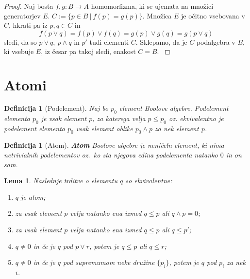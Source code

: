 \documentclass{amsart}
\newtheorem{lema}[izrek]{Lema}
\newtheorem{definicija}[izrek]{Definicija}
\begin{document}
\begin{proof}
    Naj bosta \(f,g : B \to A\) homomorfizma, ki se ujemata na množici generatorjev $E$.
    \(C := \{p \in B~|~ f(p) = g (p)\}\). Množica $E$ je očitno vsebovana v
    $C$, hkrati pa iz \(p,q \in C\) in 
    \[f(p \vee q) = f(p) \vee f(q) = g(p) \vee g(q) = g(p\vee q)\]
    sledi, da so \(p \vee q,~ p \wedge q\) in \(p'\) tudi elementi $C$.
    Sklepamo, da je $C$ podalgebra v $B$, ki vsebuje $E$, iz česar pa takoj sledi, 
    enakost \(C = B\).
    \label{enolicno}
\end{proof}

\section{Atomi}

\begin{definicija}[Podelement]
    Naj bo $p_0$ element Boolove algebre. Podelement elementa $p_0$ je vsak element
    \(p\), za katerega velja \(p \leq p_0\) oz. ekvivalentno je podelement elementa $p_0$ vsak element oblike
    \(p_0 \wedge p\) za nek element \(p\).
\end{definicija}

\begin{definicija}[Atom]
    {\bf Atom} Boolove algebre je neničeln element, ki nima netrivialnih podelementov oz.\ ko sta njegova edina podelementa natanko $0$ in on sam.
\end{definicija}

\begin{lema}
    Naslednje trditve o elementu $q$ so ekvivalentne:
    \begin{enumerate}
        \item $q$ je atom;
        \item za vsak element $p$ velja natanko ena izmed \(q \leq p\) ali \(q \wedge p = 0\);
        \item za vsak element $p$ velja natanko ena izmed \(q \leq p\) ali \(q \leq p'\);
        \item \(q \neq 0\) in če je $q$ pod \(p \vee r\), potem je \(q \leq p\) ali \(q \leq r\);
        \item \(q \neq 0\) in če je $q$ pod supremumom neke družine \(\{p_i\}\), potem je \(q\) pod \(p_i\) za nek \(i\).
    \end{enumerate}
\end{lema}
\end{document}

